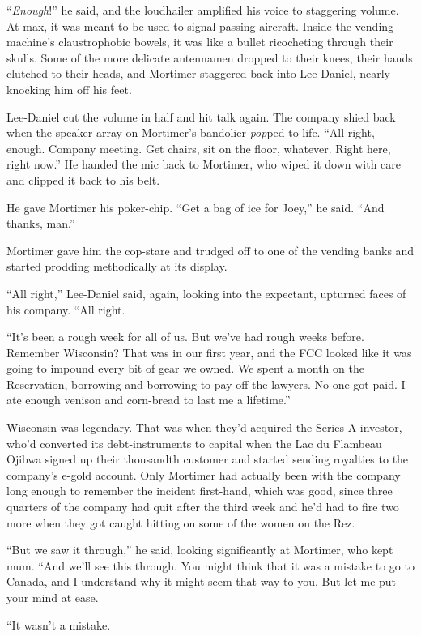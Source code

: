 “\emph{Enough}!” he said, and the loudhailer amplified his voice to 
staggering volume. At max, it was meant to be used to signal passing 
aircraft. Inside the vending-machine's claustrophobic bowels, it was 
like a bullet ricocheting through their skulls. Some of the more 
delicate antennamen dropped to their knees, their hands clutched to 
their heads, and Mortimer staggered back into Lee-Daniel, nearly 
knocking him off his feet.

Lee-Daniel cut the volume in half and hit talk again. The company shied 
back when the speaker array on Mortimer's bandolier \emph{pop}ped to 
life. “All right, enough. Company meeting. Get chairs, sit on the 
floor, whatever. Right here, right now.” He handed the mic back to 
Mortimer, who wiped it down with care and clipped it back to his belt.

He gave Mortimer his poker-chip. “Get a bag of ice for Joey,” he 
said. “And thanks, man.”

Mortimer gave him the cop-stare and trudged off to one of the vending 
banks and started prodding methodically at its display.

“All right,” Lee-Daniel said, again, looking into the expectant, 
upturned faces of his company. “All right.

“It's been a rough week for all of us. But we've had rough weeks 
before. Remember Wisconsin? That was in our first year, and the FCC 
looked like it was going to impound every bit of gear we owned. We 
spent a month on the Reservation, borrowing and borrowing to pay off 
the lawyers. No one got paid. I ate enough venison and corn-bread to 
last me a lifetime.”

Wisconsin was legendary. That was when they'd acquired the Series A 
investor, who'd converted its debt-instruments to capital when the Lac 
du Flambeau Ojibwa signed up their thousandth customer and started 
sending royalties to the company's e-gold account. Only Mortimer had 
actually been with the company long enough to remember the incident 
first-hand, which was good, since three quarters of the company had 
quit after the third week and he'd had to fire two more when they got 
caught hitting on some of the women on the Rez.

“But we saw it through,” he said, looking significantly at 
Mortimer, who kept mum. “And we'll see this through. You might think 
that it was a mistake to go to Canada, and I understand why it might 
seem that way to you. But let me put your mind at ease.

“It wasn't a mistake.

